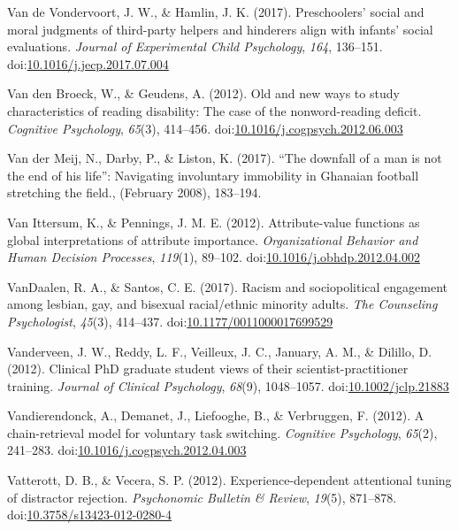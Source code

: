 \documentclass[english,man]{apa6}
\begin{document}
\hypertarget{ref-VandeVondervoort2017}{}
Van de Vondervoort, J. W., \& Hamlin, J. K. (2017). Preschoolers' social
and moral judgments of third-party helpers and hinderers align with
infants' social evaluations. \emph{Journal of Experimental Child
Psychology}, \emph{164}, 136--151.
doi:\href{https://doi.org/10.1016/j.jecp.2017.07.004}{10.1016/j.jecp.2017.07.004}

\hypertarget{ref-VandenBroeck2012}{}
Van den Broeck, W., \& Geudens, A. (2012). Old and new ways to study
characteristics of reading disability: The case of the nonword-reading
deficit. \emph{Cognitive Psychology}, \emph{65}(3), 414--456.
doi:\href{https://doi.org/10.1016/j.cogpsych.2012.06.003}{10.1016/j.cogpsych.2012.06.003}

\hypertarget{ref-Darby2017}{}
Van der Meij, N., Darby, P., \& Liston, K. (2017). ``The downfall of a
man is not the end of his life'': Navigating involuntary immobility in
Ghanaian football stretching the field., (February 2008), 183--194.

\hypertarget{ref-VanIttersum2012}{}
Van Ittersum, K., \& Pennings, J. M. E. (2012). Attribute-value
functions as global interpretations of attribute importance.
\emph{Organizational Behavior and Human Decision Processes},
\emph{119}(1), 89--102.
doi:\href{https://doi.org/10.1016/j.obhdp.2012.04.002}{10.1016/j.obhdp.2012.04.002}

\hypertarget{ref-VanDaalen2017}{}
VanDaalen, R. A., \& Santos, C. E. (2017). Racism and sociopolitical
engagement among lesbian, gay, and bisexual racial/ethnic minority
adults. \emph{The Counseling Psychologist}, \emph{45}(3), 414--437.
doi:\href{https://doi.org/10.1177/0011000017699529}{10.1177/0011000017699529}

\hypertarget{ref-Vanderveen2012}{}
Vanderveen, J. W., Reddy, L. F., Veilleux, J. C., January, A. M., \&
Dilillo, D. (2012). Clinical PhD graduate student views of their
scientist-practitioner training. \emph{Journal of Clinical Psychology},
\emph{68}(9), 1048--1057.
doi:\href{https://doi.org/10.1002/jclp.21883}{10.1002/jclp.21883}

\hypertarget{ref-Vandierendonck2012}{}
Vandierendonck, A., Demanet, J., Liefooghe, B., \& Verbruggen, F.
(2012). A chain-retrieval model for voluntary task switching.
\emph{Cognitive Psychology}, \emph{65}(2), 241--283.
doi:\href{https://doi.org/10.1016/j.cogpsych.2012.04.003}{10.1016/j.cogpsych.2012.04.003}

\hypertarget{ref-Vatterott2012}{}
Vatterott, D. B., \& Vecera, S. P. (2012). Experience-dependent
attentional tuning of distractor rejection. \emph{Psychonomic Bulletin
\& Review}, \emph{19}(5), 871--878.
doi:\href{https://doi.org/10.3758/s13423-012-0280-4}{10.3758/s13423-012-0280-4}
\end{document}
